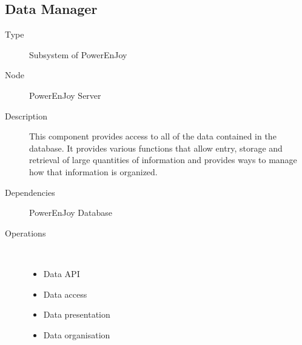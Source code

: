 \subsection{Data Manager}
\begin{description}
	\item[Type] Subsystem of PowerEnJoy
	\item[Node] PowerEnJoy Server
	\item[Description] This component provides access to all of the data contained in the database. It provides various functions that allow entry, storage and retrieval of large quantities of information and provides ways to manage how that information is organized.
	\item[Dependencies] PowerEnJoy Database
	\item[Operations] \ \\
		\begin{itemize}
			\item Data API
			\item Data access
			\item Data presentation
			\item Data organisation
		\end{itemize}
\end{description}
\newpage

